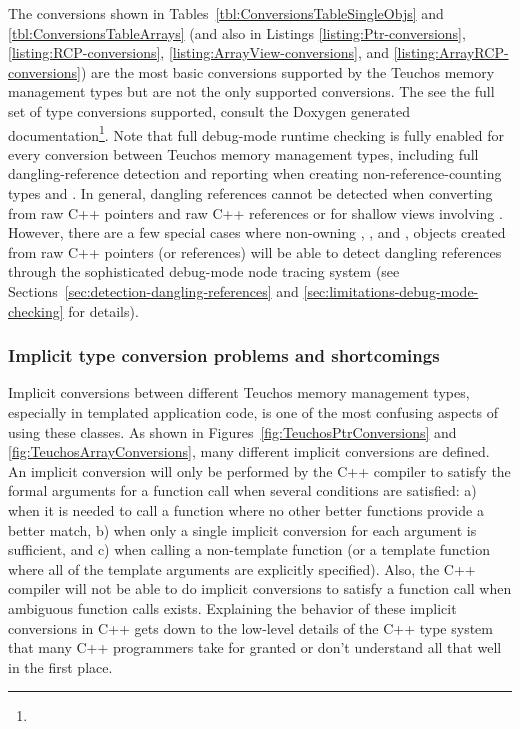 \documentclass[pdf,ps2pdf,11pt]{SANDreport}
\begin{document}
The conversions shown in Tables~\ref{tbl:ConversionsTableSingleObjs}
and {}\ref{tbl:ConversionsTableArrays} (and also in Listings
{}\ref{listing:Ptr-conversions}, {}\ref{listing:RCP-conversions},
{}\ref{listing:ArrayView-conversions}, and
{}\ref{listing:ArrayRCP-conversions}) are the most basic conversions
supported by the Teuchos memory management types but are not the only
supported conversions.  The see the full set of type conversions
supported, consult the Doxygen generated
documentation\footnote{}.
Note that full debug-mode runtime checking is fully enabled for every
conversion between Teuchos memory management types, including full
dangling-reference detection and reporting when creating
non-reference-counting types {} and {}.  In
general, dangling references cannot be detected when converting from
raw C++ pointers {} and raw C++ references {} or for
shallow views involving {}.  However, there are a few
special cases where non-owning {}, {}, and
{}, {} objects created from raw C++
pointers (or references) will be able to detect dangling references
through the sophisticated debug-mode node tracing system (see
Sections~\ref{sec:detection-dangling-references} and
{}\ref{sec:limitations-debug-mode-checking} for details).


%
{}\subsubsection{Implicit type conversion problems and shortcomings}
\label{sec:conversion-problems}
%

Implicit conversions between different Teuchos memory management
types, especially in templated application code, is one of the most
confusing aspects of using these classes.  As shown in
Figures~\ref{fig:TeuchosPtrConversions} and
{}\ref{fig:TeuchosArrayConversions}, many different implicit
conversions are defined.  An implicit conversion will only be
performed by the C++ compiler to satisfy the formal arguments for a
function call when several conditions are satisfied: a) when it is
needed to call a function where no other better functions provide a
better match, b) when only a single implicit conversion for each
argument is sufficient, and c) when calling a non-template function
(or a template function where all of the template arguments are
explicitly specified).  Also, the C++ compiler will not be able to do
implicit conversions to satisfy a function call when ambiguous
function calls exists.  Explaining the behavior of these implicit
conversions in C++ gets down to the low-level details of the C++ type
system that many C++ programmers take for granted or don't understand
all that well in the first place.
\end{document}
